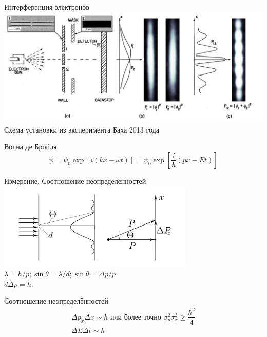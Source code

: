 \documentclass[12]{beamer}
\begin{document}
\begin{frame}[t]{Интерференция электронов}
\includegraphics[width=\textwidth]{Seminar_03/pics/pres_pic_02.PNG}
Схема установки из эксперимента Баха 2013 года\\
\begin{block}{Волна де Бройля}
\begin{equation*}
    \psi = \psi_0 \exp{\left[i\left(kx - \omega t \right)\right]} =\psi_0 \exp{\left[\dfrac{i}{\hbar}\left(px - Et \right)\right]}
\end{equation*}
\end{block}
\end{frame}

\begin{frame}[t]{Измерение. Соотношение неопределенностей}
\includegraphics[width=0.7\textwidth,keepaspectratio]{Seminar_03/pics/pic_02.png}
$\lambda = h/p; \sin{\theta} = \lambda/d; \sin{\theta} = \Delta p / p$ \\$d\Delta p = h$.
\begin{block}{Соотношение неопределённостей}
\begin{gather*}
    \Delta p_x \Delta x \sim h \text{ или более точно } \sigma^2_p \sigma^2_x \ge \dfrac{\hbar^2}{4}\\
    \Delta E \Delta t \sim h
\end{gather*}
\end{block}
\end{frame}
\end{document}
